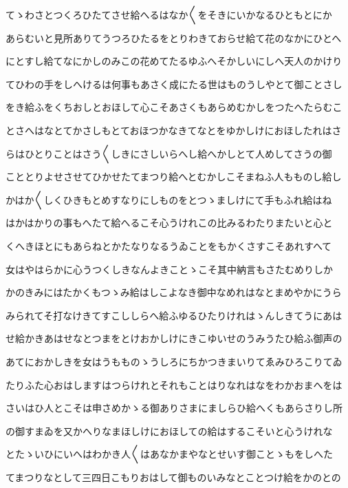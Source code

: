 \documentclass[a4paper,11pt,landscape]{ltjtarticle}
\begin{document}
\par\medskip
てゝわさとつくろひたてさせ給へるはなか〱をそきにいかなるひともとにか
\par\medskip
あらむいと見所ありてうつろひたるをとりわきておらせ給て花のなかにひとへ
\par\medskip
にとすし給てなにかしのみこの花めてたるゆふへそかしいにしへ天人のかけり
\par\medskip
てひわの手をしへけるは何事もあさく成にたる世はものうしやとて御ことさし
\par\medskip
をき給ふをくちおしとおほして心こそあさくもあらめむかしをつたへたらむこ
\par\medskip
とさへはなとてかさしもとておほつかなきてなとをゆかしけにおほしたれはさ
\par\medskip
らはひとりことはさう〱しきにさしいらへし給へかしとて人めしてさうの御
\par\medskip
こととりよせさせてひかせたてまつり給へとむかしこそまねふ人もものし給し
\par\medskip
かはか〱しくひきもとめすなりにしものをとつゝましけにて手もふれ給はね
\par\medskip
はかはかりの事もへたて給へるこそ心うけれこの比みるわたりまたいと心と
\par\medskip
くへきほとにもあらねとかたなりなるうゐことをもかくさすこそあれすへて
\par\medskip
女はやはらかに心うつくしきなんよきことゝこそ其中納言もさたむめりしか
\par\medskip
かのきみにはたかくもつゝみ給はしこよなき御中なめれはなとまめやかにうら
\par\medskip
みられてそ打なけきてすこししらへ給ふゆるひたりけれはゝんしきてうにあは
\par\medskip
せ給かきあはせなとつまをとけおかしけにきこゆいせのうみうたひ給ふ御声の
\par\medskip
あてにおかしきを女はうもものゝうしろにちかつきまいりてゑみひろこりてゐ
\par\medskip
たりふた心おはしますはつらけれとそれもことはりなれはなをわかおまへをは
\par\medskip
さいはひ人とこそは申さめかゝる御ありさまにましらひ給へくもあらさりし所
\par\medskip
の御すまゐを又かへりなまほしけにおほしての給はするこそいと心うけれな
\par\medskip
とたゝいひにいへはわかき人〱はあなかまやなとせいす御ことゝもをしへた
\par\medskip
てまつりなとして三四日こもりおはして御ものいみなとことつけ給をかのとの
\par\medskip
\end{document}
